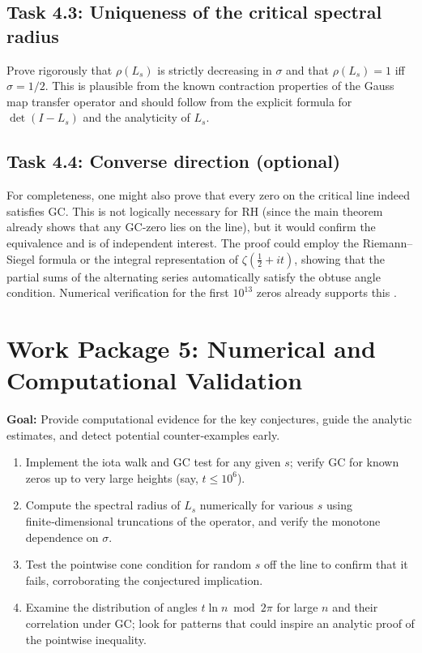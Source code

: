 \documentclass[11pt,a4paper]{article}
\begin{document}
\subsection{Task 4.3: Uniqueness of the critical spectral radius}
Prove rigorously that $\rho(L_s)$ is strictly decreasing in $\sigma$ and that $\rho(L_s) = 1$ iff $\sigma = 1/2$.  This is plausible from the known contraction properties of the Gauss map transfer operator and should follow from the explicit formula for $\det(I - L_s)$ and the analyticity of $L_s$.

\subsection{Task 4.4: Converse direction (optional)}
For completeness, one might also prove that every zero on the critical line indeed satisfies GC.  This is not logically necessary for RH (since the main theorem already shows that any GC‑zero lies on the line), but it would confirm the equivalence and is of independent interest.  The proof could employ the Riemann–Siegel formula or the integral representation of $\zeta(\frac12+it)$, showing that the partial sums of the alternating series automatically satisfy the obtuse angle condition.  Numerical verification for the first $10^{13}$ zeros already supports this \cite{Platt}.

\section{Work Package 5: Numerical and Computational Validation}

\textbf{Goal:}  Provide computational evidence for the key conjectures, guide the analytic estimates, and detect potential counter‑examples early.

\begin{enumerate}[nosep]
\item Implement the iota walk and GC test for any given $s$; verify GC for known zeros up to very large heights (say, $t \le 10^6$).
\item Compute the spectral radius of $L_s$ numerically for various $s$ using finite‑dimensional truncations of the operator, and verify the monotone dependence on $\sigma$.
\item Test the pointwise cone condition for random $s$ off the line to confirm that it fails, corroborating the conjectured implication.
\item Examine the distribution of angles $t \ln n \bmod 2\pi$ for large $n$ and their correlation under GC; look for patterns that could inspire an analytic proof of the pointwise inequality.
\end{enumerate}
\end{document}
